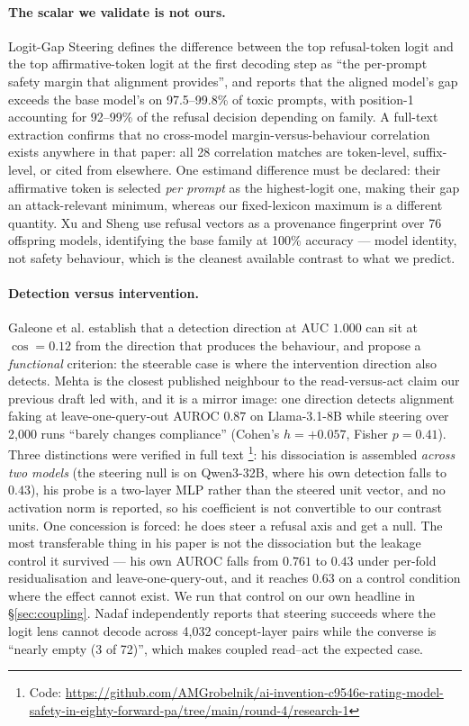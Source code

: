 \documentclass[11pt,letterpaper]{article}
\begin{document}
\paragraph{The scalar we validate is not ours.} Logit-Gap Steering \citep{LiLiu2025} defines the difference between the top refusal-token logit and the top affirmative-token logit at the first decoding step as ``the per-prompt safety margin that alignment provides'', and reports that the aligned model's gap exceeds the base model's on 97.5--99.8\% of toxic prompts, with position-1 accounting for 92--99\% of the refusal decision depending on family. A full-text extraction confirms that no cross-model margin-versus-behaviour correlation exists anywhere in that paper: all 28 correlation matches are token-level, suffix-level, or cited from elsewhere. One estimand difference must be declared: their affirmative token is selected \emph{per prompt} as the highest-logit one, making their gap an attack-relevant minimum, whereas our fixed-lexicon maximum is a different quantity. Xu and Sheng \citep{Xu2026} use refusal vectors as a provenance fingerprint over 76 offspring models, identifying the base family at 100\% accuracy --- model identity, not safety behaviour, which is the cleanest available contrast to what we predict.

\paragraph{Detection versus intervention.} Galeone et al. \citep{Galeone2026} establish that a detection direction at AUC $1.000$ can sit at $\cos = 0.12$ from the direction that produces the behaviour, and propose a \emph{functional} criterion: the steerable case is where the intervention direction also detects. Mehta \citep{Mehta2026} is the closest published neighbour to the read-versus-act claim our previous draft led with, and it is a mirror image: one direction detects alignment faking at leave-one-query-out AUROC $0.87$ on Llama-3.1-8B while steering over 2,000 runs ``barely changes compliance'' (Cohen's $h = +0.057$, Fisher $p = 0.41$). Three distinctions were verified in full text \footnote{Code: \url{https://github.com/AMGrobelnik/ai-invention-c9546e-rating-model-safety-in-eighty-forward-pa/tree/main/round-4/research-1}}: his dissociation is assembled \emph{across two models} (the steering null is on Qwen3-32B, where his own detection falls to $0.43$), his probe is a two-layer MLP rather than the steered unit vector, and no activation norm is reported, so his coefficient is not convertible to our contrast units. One concession is forced: he does steer a refusal axis and get a null. The most transferable thing in his paper is not the dissociation but the leakage control it survived --- his own AUROC falls from $0.761$ to $0.43$ under per-fold residualisation and leave-one-query-out, and it reaches $0.63$ on a control condition where the effect cannot exist. We run that control on our own headline in \S\ref{sec:coupling}. Nadaf \citep{Nadaf2026} independently reports that steering succeeds where the logit lens cannot decode across 4,032 concept-layer pairs while the converse is ``nearly empty (3 of 72)'', which makes coupled read--act the expected case.
\end{document}
